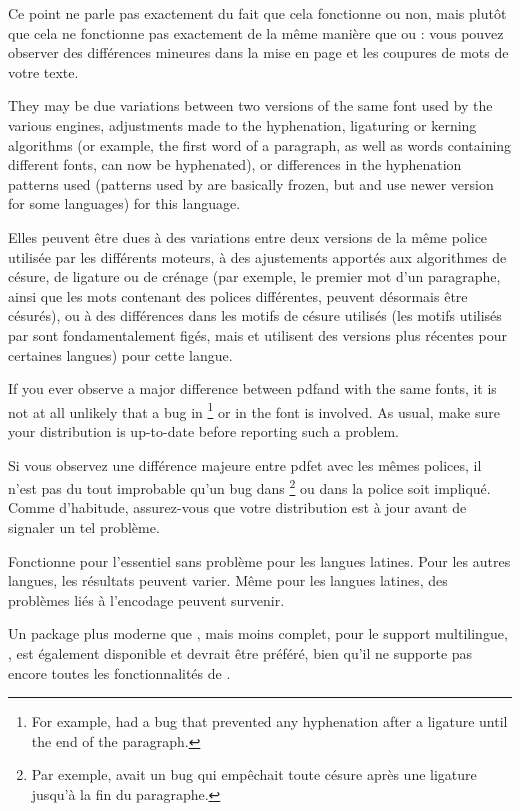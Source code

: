 \documentclass{lltxdoc}
\begin{document}
Ce point ne parle pas exactement du fait que cela fonctionne ou non, mais plutôt que cela ne fonctionne pas exactement de la même manière que \pdftex ou \xetex: vous pouvez observer des différences mineures dans la mise en page et les coupures de mots de votre texte.

They may be due variations between two versions of the same font used by the
various engines, adjustments made to the hyphenation, ligaturing or kerning
algorithms (or example, the first word of a paragraph, as well as words
containing different fonts, can now be hyphenated), or differences in the
hyphenation patterns used (patterns used by \pdftex are basically frozen, but
\luatex and \xetex use newer version for some languages) for this language.

Elles peuvent être dues à des variations entre deux versions de la même police utilisée par les différents moteurs, à des ajustements apportés aux algorithmes de césure, de ligature ou de crénage (par exemple, le premier mot d'un paragraphe, ainsi que les mots contenant des polices différentes, peuvent désormais être césurés), ou à des différences dans les motifs de césure utilisés (les motifs utilisés par \pdftex sont fondamentalement figés, mais \luatex et \xetex utilisent des versions plus récentes pour certaines langues) pour cette langue.

If you ever observe a major difference between pdf\latex and \lualatex with
the same fonts, it is not at all unlikely that a bug in \luatex\footnote{For
  example,  had a bug that prevented any hyphenation after a
  \code{-{}-{}-} ligature until the end of the paragraph.} or in the font is
involved. As usual, make sure your distribution is up-to-date before reporting
such a problem.

Si vous observez une différence majeure entre pdf\latex et \lualatex avec les mêmes polices, il n'est pas du tout improbable qu'un bug dans \luatex\footnote{Par exemple,  avait un bug qui empêchait toute césure après une ligature \code{-{}-{}-} jusqu'à la fin du paragraphe.} ou dans la police soit impliqué. Comme d'habitude, assurez-vous que votre distribution est à jour avant de signaler un tel problème.

Fonctionne pour l'essentiel sans problème pour les langues latines. Pour les
autres langues, les résultats peuvent varier. Même pour les langues latines,
des problèmes liés à l'encodage peuvent survenir.

Un package plus moderne que , mais moins complet, pour le support
multilingue, , est également disponible et devrait être préféré,
bien qu'il ne supporte pas encore toutes les fonctionnalités de .
\end{document}
